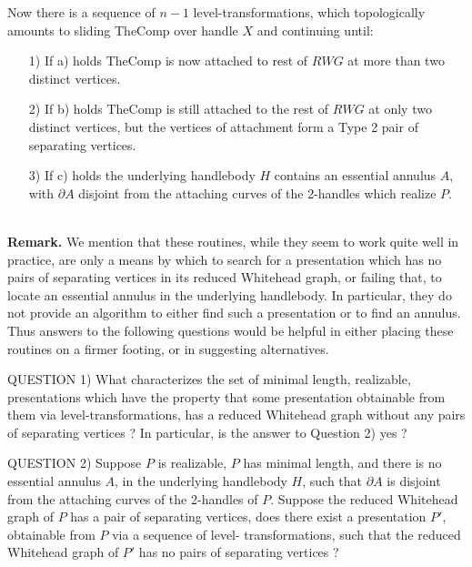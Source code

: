 \documentclass[12pt]{amsart}
\newcommand{\remark}{\ \\ \noindent \textbf{Remark.} }
\begin{document}
                Now there is a sequence of $n-1$ level-transformations, which topologically amounts
        to sliding TheComp over handle $X$ and continuing until:
        \begin{enumerate}
                \item[1)]      If a) holds TheComp is now attached to rest of $RWG$ at more than two distinct
                        vertices.
                \item[2)]      If b) holds TheComp is still attached to the rest of $RWG$ at only two distinct
                        vertices, but the vertices of attachment form a Type 2 pair of separating
                        vertices.
                \item[3)]      If c) holds the underlying handlebody $H$ contains an essential annulus $A$, with
                        $\partial A$ disjoint from the attaching curves of the 2-handles which realize $P$.
        \end{enumerate}
                                        

\remark We mention that these routines, while they seem to work quite well in practice, are
        only a means by which to search for a presentation which has no pairs of separating
        vertices in its reduced Whitehead graph, or failing that, to locate an essential annulus
        in the underlying handlebody. In particular, they do not provide an algorithm to either
        find such a presentation or to find an annulus. Thus answers to the following questions
        would be helpful in either placing these routines on a firmer footing, or in suggesting
        alternatives.

QUESTION 1)     What characterizes the set of minimal length, realizable, presentations which
        have the property that some presentation obtainable from them via level-transformations,
        has a reduced Whitehead graph without any pairs of separating vertices ? In particular,
        is the answer to Question 2) yes ?

QUESTION 2) Suppose $P$ is realizable, $P$ has minimal length, and there is no essential annulus
        $A$, in the underlying handlebody $H$, such that $\partial A$ is disjoint from the attaching curves of
        the 2-handles of $P$. Suppose the reduced Whitehead graph of $P$ has a pair of separating
        vertices, does there exist a presentation $P'$, obtainable from $P$ via a sequence of level-
        transformations, such that the reduced Whitehead graph of $P'$ has no pairs of separating
        vertices ?
        
\end{document}
